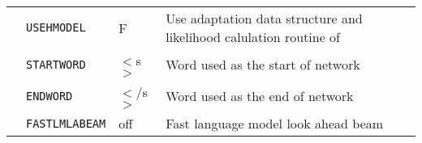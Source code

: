 \begin{center}
\begin{supertabular}{|p{1.8cm}|l|l|p{6.6cm}|}


& \texttt{USEHMODEL} & F & Use adaptation data structure and likelihood calulation routine of 


 \\


 & \texttt{STARTWORD} & $<$s$>$ & Word used as the start of network \\


 & \texttt{ENDWORD} & $<$/s$>$ & Word used as the end of network \\


 & \texttt{FASTLMLABEAM} & off & Fast language model look ahead beam \\\hline





\end{supertabular}


\end{center}






\clearpage
















